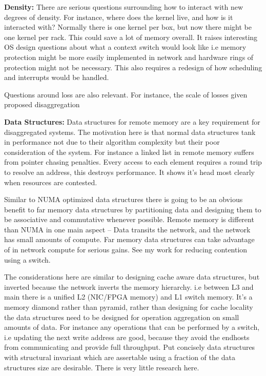 \textbf{Density:}
There are serious questions surrounding how to interact with new degrees of
density. For instance, where does the kernel live, and how is it interacted
with? Normally there is one kernel per box, but now there might be one kernel
per rack. This could save a lot of memory overall. It raises interesting OS
design questions about what a context switch would look like i.e memory
protection might be more easily implemented in network and hardware rings of
protection might not be necessary. This also requires a redesign of how
scheduling and interrupts would be handled.

Questions around loss are also relevant. For instance, the scale of losses given
proposed disaggregation 


\textbf{Data Structures:}
Data structures for remote memory are a key requirement
for disaggregated systems. The motivation here is that normal data structures
tank in performance not due to their algorithm complexity but their poor
consideration of the system. For instance a linked list in remote memory suffers
from pointer chasing penalties. Every access to each element requires a round
trip to resolve an address, this destroys performance. It shows it's head most
clearly when resources are contested.

Similar to NUMA optimized data structures there is going to be an obvious
benefit to far memory data structures by partitioning data and designing them to
be associative and commutative whenever possible. Remote memory is different than
NUMA in one main aspect -- Data transits the network, and the network has small
amounts of compute. Far memory data structures can take advantage of in network
compute for serious gains. See my work for reducing contention using a switch.

The considerations here are similar to designing cache aware data structures,
but inverted because the network inverts the memory hierarchy. i.e between L3 and
main there is a unified L2 (NIC/FPGA memory) and L1 switch memory. It's a memory
diamond rather than pyramid, rather than designing for cache locality the data
structures need to be designed for operation aggregation on small amounts of
data. For instance any operations that can be performed by a switch, i.e
updating the next write address are good, because they avoid the endhosts from
communicating and provide full throughput. Put concisely data structures with
structural invariant which are assertable using a fraction of the data
structures size are desirable. There is very little research here.

